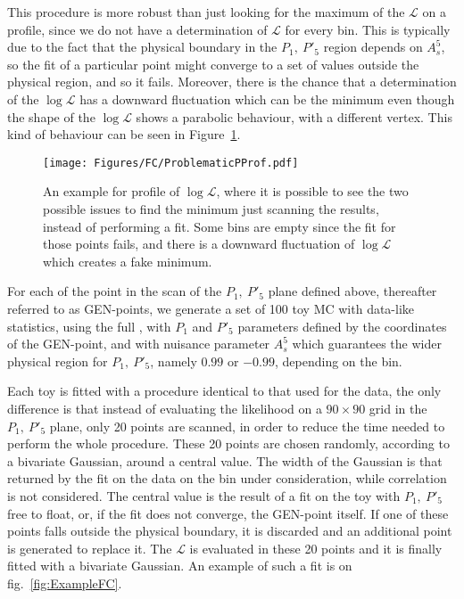 This procedure is more robust than just looking for the maximum of the $\mathcal{L}$ on a profile, since we do not have a determination of $\mathcal{L}$ for every bin.
This is typically due to the fact that the physical boundary in the  $P_1,~P'_5$ region depends on $A_s^5$, so the fit of a particular point might converge to a set of values outside the physical region, and so it fails.
Moreover, there is the chance that a determination of the $\log\mathcal{L}$ has a downward fluctuation which can be the minimum even though the shape of the $\log\mathcal{L}$ shows a parabolic behaviour, with a different vertex.
This kind of behaviour can be seen in Figure~\ref{fig:ProblematicPProf}.

\begin{figure}
  \centering
  \texttt{[image: Figures/FC/ProblematicPProf.pdf]}
  \caption{An example for profile of $\log\mathcal{L}$, where it is possible to see the two possible issues to find the minimum just scanning the results, instead of performing a fit.
    Some bins are empty since the fit for those points fails, and there is a downward fluctuation of $\log\mathcal{L}$ which creates a fake minimum.}
  \label{fig:ProblematicPProf}
\end{figure}

For each of the point in the scan of the $P_1,~P'_5$ plane defined above, thereafter referred to as GEN-points, we generate a set of 100 toy MC with data-like statistics, using the full \pdf, with $P_1$ and $P'_5$ parameters defined by the coordinates of the GEN-point, and with nuisance parameter $A_s^5$ which guarantees the wider physical region for $P_1,~P'_5$, namely $0.99$ or $-0.99$, depending on the bin.

Each toy is fitted with a procedure identical to that used for the data, the only difference is that instead of evaluating the likelihood on a $90\times90$ grid in the $P_1,~P'_5$ plane, only 20 points are scanned, in order to reduce the time needed to perform the whole procedure.
These 20 points are chosen randomly, according to a bivariate Gaussian, around a central value.
The width of the Gaussian is that returned by the fit on the data on the bin under consideration, while correlation is not considered.
The central value is the result of a fit on the toy with $P_1,~P'_5$ free to float, or, if the fit does not converge, the GEN-point itself.
If one of these points falls outside the physical boundary, it is discarded and an additional point is generated to replace it.
The $\mathcal{L}$ is evaluated in these 20 points and it is finally fitted with a bivariate Gaussian.
An example of such a fit is on fig.~\ref{fig:ExampleFC}.

